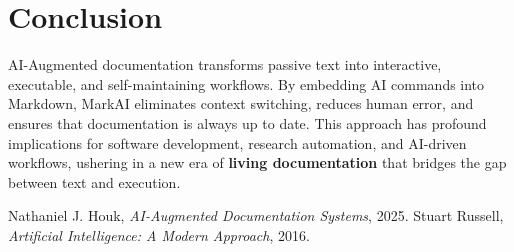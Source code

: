 \documentclass{article}
\begin{document}
\section{Conclusion}
AI-Augmented documentation transforms passive text into interactive, executable, and self-maintaining workflows. By embedding AI commands into Markdown, MarkAI eliminates context switching, reduces human error, and ensures that documentation is always up to date. This approach has profound implications for software development, research automation, and AI-driven workflows, ushering in a new era of \textbf{living documentation} that bridges the gap between text and execution.

\begin{thebibliography}{9}
 Nathaniel J. Houk, \textit{AI-Augmented Documentation Systems}, 2025.
 Stuart Russell, \textit{Artificial Intelligence: A Modern Approach}, 2016.
\end{thebibliography}
\end{document}
